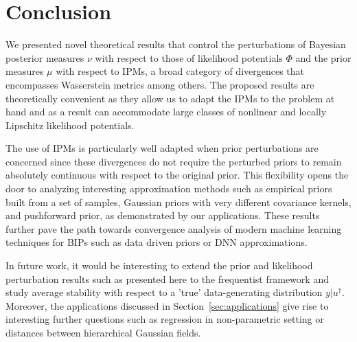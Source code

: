 \documentclass[final]{siamart171218}
\begin{document}
\section{Conclusion}
We presented novel theoretical results that control the perturbations of 
Bayesian posterior measures $\nu$ with respect to those of likelihood potentials $\Phi$ and 
the prior measures $\mu$ with respect to IPMs, a broad category of divergences
 that encompasses Wasserstein metrics among others.
The proposed results are 
theoretically convenient as they allow us to adapt the IPMs to the problem at hand 
and as a result can accommodate large classes of nonlinear and locally Lipschitz 
likelihood potentials. 

The use of IPMs is particularly well adapted when prior perturbations are concerned since these 
divergences do not require the perturbed priors to remain absolutely continuous with 
respect to the original prior. This flexibility opens the door to analyzing interesting 
approximation methods such as empirical priors built from a set of samples,
Gaussian priors with very different covariance kernels, and pushforward prior, as 
demonstrated by our applications. These results further pave the path towards 
convergence analysis of modern machine learning techniques for BIPs such as 
data driven priors or DNN approximations. 




In future work, it would be interesting to extend the prior and likelihood perturbation results such as presented here to the frequentist framework and study average stability with respect to a 'true' data-generating distribution $y|u^\dagger$. Moreover, the applications discussed in Section~\ref{sec:applications} give rise to interesting further questions such as regression in non-parametric setting or distances between hierarchical Gaussian fields.
\end{document}
